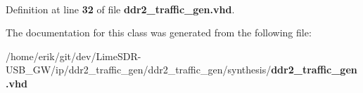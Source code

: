 \paragraph[{ddr2\+\_\+traffic\+\_\+gen\+\_\+mm\+\_\+traffic\+\_\+generator\+\_\+0}]{ {\bfseries \textcolor{vhdlchar}{ }} \hspace{0.3cm}{\ttfamily [Component]}}\label{classddr2__traffic__gen_1_1rtl_a73757f897de1f1e1e6a580b328ac01d7}


Definition at line {\bf 32} of file {\bf ddr2\+\_\+traffic\+\_\+gen.\+vhd}.



The documentation for this class was generated from the following file\+:\begin{DoxyCompactItemize}
\item 
/home/erik/git/dev/\+Lime\+S\+D\+R-\/\+U\+S\+B\+\_\+\+G\+W/ip/ddr2\+\_\+traffic\+\_\+gen/ddr2\+\_\+traffic\+\_\+gen/synthesis/{\bf ddr2\+\_\+traffic\+\_\+gen.\+vhd}\end{DoxyCompactItemize}
